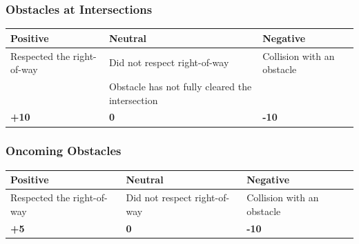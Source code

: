 \subsubsection*{Obstacles at Intersections}
\begin{table}[H]
	\begin{tabularx}{\textwidth}{XXX}
		\toprule
		\textbf{Positive}                           & \textbf{Neutral}                                & \textbf{Negative}          \\
		\midrule
		Respected the right-of-way \footnotemark[1] & Did not respect right-of-way \footnotemark[1]   & Collision with an obstacle \\
		                                            & Obstacle has not fully cleared the intersection &                            \\
		\topstrut
		\textbf{+10}                                & \textbf{0}                                      & \textbf{-10}               \\
		\bottomrule
	\end{tabularx}
\end{table}

\subsubsection*{Oncoming Obstacles}
\begin{table}[H]
	\begin{tabularx}{\textwidth}{XXX}
		\toprule
		\textbf{Positive}                           & \textbf{Neutral}                              & \textbf{Negative}          \\
		\midrule
		Respected the right-of-way \footnotemark[1] & Did not respect right-of-way \footnotemark[1] & Collision with an obstacle \\
		\topstrut
		\textbf{+5}                                 & \textbf{0}                                    & \textbf{-10}               \\
		\bottomrule
	\end{tabularx}
\end{table}


